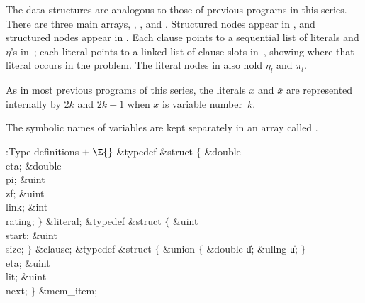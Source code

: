 The data structures are analogous to those of previous programs in this
series. There are three main arrays, , , and . Structured
 nodes appear in , and structured 
nodes
appear in . Each clause points to a sequential list of literals
and
$\eta$'s in~; each literal points to a linked list of clause slots
in~, showing where that literal occurs in the problem. The literal
nodes in  also hold $\eta_l$ and $\pi_l$.

As in most previous programs of this series, the literals $x$ and $\bar x$
are represented internally by $2k$ and $2k+1$ when $x$ is variable number~$k$.

The symbolic names of variables are kept separately in an array called .

\Y\B\4:Type definitions\X${}\mathrel+\E{}$\6
\&{typedef} \&{struct} ${}\{{}$\1\6
\&{double} \\{eta};\6
\&{double} \\{pi};\6
\&{uint} \\{zf};\6
\&{uint} \\{link};%
\6
\&{int} \\{rating};%
\2\6
${}\}{}$ \&{literal};\6
\&{typedef} \&{struct} ${}\{{}$\1\6
\&{uint} \\{start};\6
\&{uint} \\{size};\2\6
${}\}{}$ \&{clause};\6
\&{typedef} \&{struct} ${}\{{}$\1\6
\&{union} ${}\{{}$\5
\1\&{double} \|d;\6
\&{ullng} \|u;\2\6
${}\}{}$\5
\\{eta};\6
\&{uint} \\{lit};\6
\&{uint} \\{next};%
\2\6
${}\}{}$ \&{mem\_item};\par
\fi


